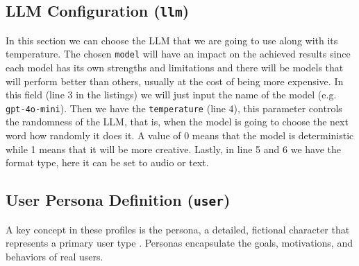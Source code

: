 \subsection{LLM Configuration (\texttt{llm})}

In this section we can choose the \acl{LLM} that we are going to use
along with its temperature.
The chosen \texttt{model} will have an impact on the achieved results
since each model has its own strengths and limitations
and there will be models that will perform better than others,
usually at the cost of being more expensive.
In this field (line 3 in the listings)
we will just input the name of the model (e.g. \texttt{gpt-4o-mini}).
Then we have the \texttt{temperature} (line 4),
this parameter controls the randomness of the \ac{LLM},
that is, when the model is going to choose the next word
how randomly it does it.
A value of 0 means that the model is deterministic
while 1 means that it will be more creative.
Lastly, in line 5 and 6 we have the format type,
here it can be set to audio or text.

\subsection{User Persona Definition (\texttt{user})}

A key concept in these profiles is the persona,
a detailed, fictional character that represents a primary user type
\autocite{cooperFaceEssentialsInteraction2014}.
Personas encapsulate the goals, motivations, and behaviors of real users.

